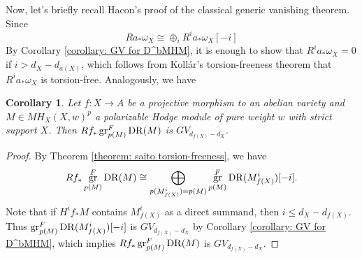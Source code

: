 \documentclass[11pt]{amsart}
\newtheorem{corollary}[equation]{Corollary}
\newtheorem{proposition}[equation]{Proposition}
\theoremstyle{definition}
\theoremstyle{plain}
\DeclareMathOperator{\DR}{DR}
\DeclareMathOperator{\gr}{{\rm gr}}
\newcommand{\Kollar}{Koll\'ar}
\begin{document}
Now, let's briefly recall Hacon's proof of the classical generic vanishing theorem. Since 
\[Ra_* \omega_X \cong \oplus_i R^i a_* \omega_X[-i]\]
By Corollary \ref{corollary: GV for D^bMHM}, it is enough to show that $R^i a_* \omega_X = 0$ if $i > d_{X} - d_{a(X)}$, which follows from \Kollar{}'s torsion-freeness theorem that $R^i a_* \omega_X$ is torsion-free. Analogously, we have

\begin{corollary} \label{corollary: GV of lowest Hodge filtration of pure HM}
    Let $f: X\to A$ be a projective morphism to an abelian variety and $M \in MH_X(X, w)^p$ a polarizable Hodge module of pure weight $w$ with strict support $X$. Then $Rf_* \gr^F_{p(M)} \DR(M)$ is $GV_{d_{f(X)}-d_X}$. 
\end{corollary}

\begin{proof}
    By Theorem \ref{theorem: saito torsion-freeness}, we have 
    \[Rf_* \gr^F_{p(M)} \DR (M) \cong \bigoplus_{p(M^i_{f(X)}) = p(M)} \gr^F_{p(M)} \DR (M^i_{f(X)})[-i].\]
    Note that if $H^if_* M$ contains $M^i_{f(X)}$ as a direct summand, then $i\le d_X - d_{f(X)}$. Thus $\gr^F_{p(M)} \DR (M^i_{f(X)})[-i]$ is $GV_{d_{f(X)}-d_X}$ by Corollary \ref{corollary: GV for D^bMHM}, which implies $Rf_* \gr^F_{p(M)} \DR(M)$ is $GV_{d_{f(X)}-d_X}$.
\end{proof}

\begin{comment}
    Consider a morphism $a:X\to A$, by Proposition \ref{proposition: grDR and f_* commute}, we have 
\[\gr^F_k \DR(a_* M^\bullet) \cong Ra_* \gr^F_k \DR(M^\bullet)\]
which implies that $p(a_*M^\bullet) \ge p(M^\bullet)$. Moreover, by the strictness of Hodge filtration, 
\[\gr^F_{p(M^\bullet)}\DR(H^i a_*M^\bullet) \cong R^i a_* \gr^F_{p(M^\bullet)} \DR(M^\bullet).\]
Combining with Theorem \ref{theorem: GV for MHM}, we obtain the following generalization about $GV$ property of higher direct images of the lowest Hodge filtration of mixed Hodge modules:

\begin{proposition}
    Let $a:X \to A$ be a proper morphism from an irreducible projective variety $X$ to an abelian variety $A$, and $M\in D^bMHM(X)$. Then $R^i a_* \gr^F_{p(M^\bullet)} \DR(M^\bullet)$ is $GV$-sheaf on $A$ for any $i$.
\end{proposition}
\end{comment}



\medskip
\end{document}
